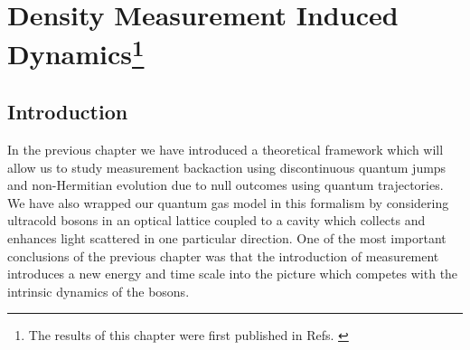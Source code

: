 
\chapter[Density Measurement Induced Dynamics]
        {Density Measurement Induced Dynamics\footnote{The results of
            this chapter were first published in
            Refs. \cite{mazzucchi2016, kozlowski2016zeno,
              mazzucchi2016njp}}}

\ifpdf
    \graphicspath{{Chapter5/Figs/Raster/}{Chapter5/Figs/PDF/}{Chapter5/Figs/}}
\else
    \graphicspath{{Chapter5/Figs/Vector/}{Chapter5/Figs/}}
\fi


\section{Introduction}

In the previous chapter we have introduced a theoretical framework
which will allow us to study measurement backaction using
discontinuous quantum jumps and non-Hermitian evolution due to null
outcomes using quantum trajectories. We have also wrapped our quantum
gas model in this formalism by considering ultracold bosons in an
optical lattice coupled to a cavity which collects and enhances light
scattered in one particular direction. One of the most important
conclusions of the previous chapter was that the introduction of
measurement introduces a new energy and time scale into the picture
which competes with the intrinsic dynamics of the bosons.


